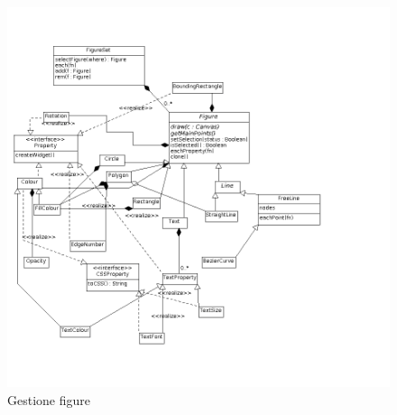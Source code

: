 \begin{figure}[!ht]
\centering
\includegraphics[scale=0.5]{images/gestionefigure.png}
\caption{Gestione figure}
\end{figure}
